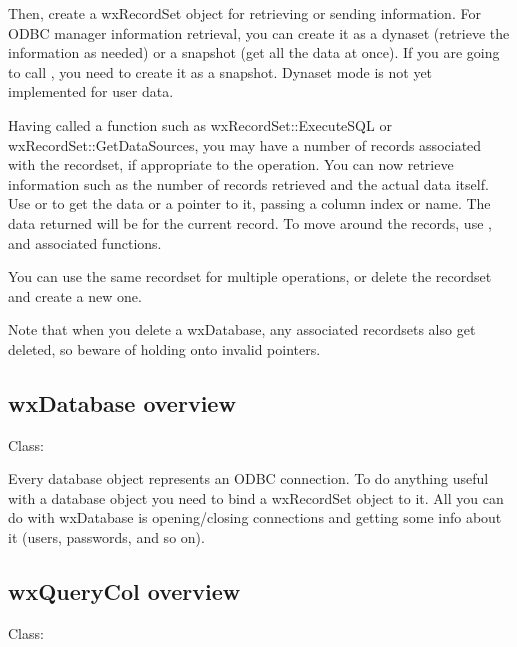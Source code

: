 Then, create a wxRecordSet object for retrieving or sending information.
For ODBC manager information retrieval, you can create it as a dynaset (retrieve the
information as needed) or a snapshot (get all the data at once).
If you are going to call , you need to create it as a snapshot.
Dynaset mode is not yet implemented for user data.

Having called a function such as wxRecordSet::ExecuteSQL or
wxRecordSet::GetDataSources, you may have a number of records
associated with the recordset, if appropriate to the operation. You can
now retrieve information such as the number of records retrieved and the
actual data itself. Use  or
 to get the data or a pointer to it, passing
a column index or name. The data returned will be for the current
record. To move around the records, use ,
\rtfsp{} and associated functions.

You can use the same recordset for multiple operations, or delete
the recordset and create a new one.

Note that when you delete a wxDatabase, any associated recordsets
also get deleted, so beware of holding onto invalid pointers.

\subsection{wxDatabase overview}\label{wxdatabaseoverview}


Class: 

Every database object represents an ODBC connection. To do anything useful
with a database object you need to bind a wxRecordSet object to it. All you
can do with wxDatabase is opening/closing connections and getting some info
about it (users, passwords, and so on).

\subsection{wxQueryCol overview}\label{wxquerycoloverview}


Class: 

